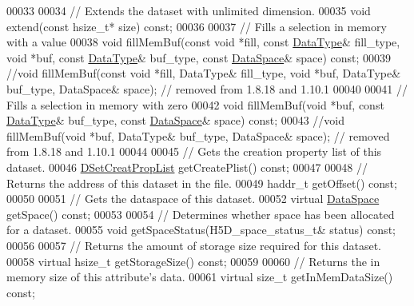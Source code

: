 \begin{DoxyCode}
00033 
00034         \textcolor{comment}{// Extends the dataset with unlimited dimension.}
00035         \textcolor{keywordtype}{void} extend(\textcolor{keyword}{const} hsize\_t* size) \textcolor{keyword}{const};
00036 
00037         \textcolor{comment}{// Fills a selection in memory with a value}
00038         \textcolor{keywordtype}{void} fillMemBuf(\textcolor{keyword}{const} \textcolor{keywordtype}{void} *fill, \textcolor{keyword}{const} \hyperlink{class_h5_1_1_data_type}{DataType}& fill\_type, \textcolor{keywordtype}{void} *buf, \textcolor{keyword}{const} 
      \hyperlink{class_h5_1_1_data_type}{DataType}& buf\_type, \textcolor{keyword}{const} \hyperlink{class_h5_1_1_data_space}{DataSpace}& space) \textcolor{keyword}{const};
00039         \textcolor{comment}{//void fillMemBuf(const void *fill, DataType& fill\_type, void *buf, DataType& buf\_type, DataSpace&
       space); // removed from 1.8.18 and 1.10.1}
00040 
00041         \textcolor{comment}{// Fills a selection in memory with zero}
00042         \textcolor{keywordtype}{void} fillMemBuf(\textcolor{keywordtype}{void} *buf, \textcolor{keyword}{const} \hyperlink{class_h5_1_1_data_type}{DataType}& buf\_type, \textcolor{keyword}{const} 
      \hyperlink{class_h5_1_1_data_space}{DataSpace}& space) \textcolor{keyword}{const};
00043         \textcolor{comment}{//void fillMemBuf(void *buf, DataType& buf\_type, DataSpace& space); // removed from 1.8.18 and
       1.10.1}
00044 
00045         \textcolor{comment}{// Gets the creation property list of this dataset.}
00046         \hyperlink{class_h5_1_1_d_set_creat_prop_list}{DSetCreatPropList} getCreatePlist() \textcolor{keyword}{const};
00047 
00048         \textcolor{comment}{// Returns the address of this dataset in the file.}
00049         haddr\_t getOffset() \textcolor{keyword}{const};
00050 
00051         \textcolor{comment}{// Gets the dataspace of this dataset.}
00052         \textcolor{keyword}{virtual} \hyperlink{class_h5_1_1_data_space}{DataSpace} getSpace() \textcolor{keyword}{const};
00053 
00054         \textcolor{comment}{// Determines whether space has been allocated for a dataset.}
00055         \textcolor{keywordtype}{void} getSpaceStatus(H5D\_space\_status\_t& status) \textcolor{keyword}{const};
00056 
00057         \textcolor{comment}{// Returns the amount of storage size required for this dataset.}
00058         \textcolor{keyword}{virtual} hsize\_t getStorageSize() \textcolor{keyword}{const};
00059 
00060         \textcolor{comment}{// Returns the in memory size of this attribute's data.}
00061         \textcolor{keyword}{virtual} \textcolor{keywordtype}{size\_t} getInMemDataSize() \textcolor{keyword}{const};

\end{DoxyCode}
